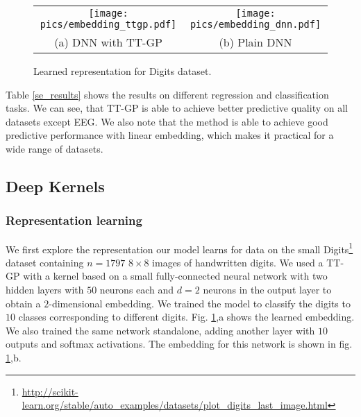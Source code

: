   \begin{figure}[!t]
    \vspace{-.3cm}
    \begin{center}
        \begin{tabular}{cc}
            \texttt{[image: pics/embedding\_ttgp.pdf]} & \texttt{[image: pics/embedding\_dnn.pdf]}\\
            (a) DNN with TT-GP & (b) Plain DNN
        \end{tabular}
    \end{center}
    \caption{Learned representation for Digits dataset.}
    \label{digits_embedding}
    \vspace{-.5cm}
  \end{figure}

Table \ref{se_results} shows the results on different regression and
classification tasks. We can see, that TT-GP is able to achieve better
predictive quality on all datasets except EEG. We also note that the
method is able to achieve good predictive performance with linear
embedding, which makes it practical for a wide range of datasets.

\subsection{Deep Kernels}

  \subsubsection{Representation learning}
  We first explore the representation our model learns for data on the small
  Digits\footnote{\url{http://scikit-learn.org/stable/auto_examples/datasets/plot_digits_last_image.html}}
  dataset containing $n = 1797$ $8 \times 8$ images of handwritten digits. We
  used a TT-GP with a kernel based on a small fully-connected neural network
  with two hidden layers with $50$ neurons each and $d = 2$ neurons in the output
  layer to obtain a $2$-dimensional embedding. We trained the model to classify
  the digits to $10$ classes corresponding to different digits.
  Fig. \ref{digits_embedding},a shows the learned embedding. We also trained the same
  network standalone, adding another layer with $10$ outputs and softmax
  activations. The embedding for this network is shown in fig. \ref{digits_embedding},b.

